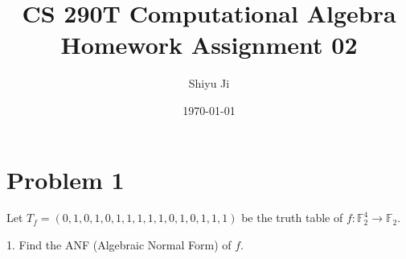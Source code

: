\documentclass[12pt]{article}
\theoremstyle{plain}
\begin{document}
\title{CS 290T Computational Algebra Homework Assignment 02}
\author{Shiyu Ji}
\date{\today}
\maketitle

\newcommand{\m}[1]{\begin{bmatrix}#1\end{bmatrix}}
\newcommand{\rank}[1]{\operatorname{rank}(#1)}
\newcommand{\F}{\mathbb{F}}

\section{Problem 1}
Let $T_f =  (0, 1, 0, 1, 0, 1, 1, 1, 1, 1, 0, 1, 0, 1, 1, 1)$ be the truth table of $f : \F_2^4 \to \F_2$.

1. Find the ANF (Algebraic Normal Form) of $f$.
\end{document}

